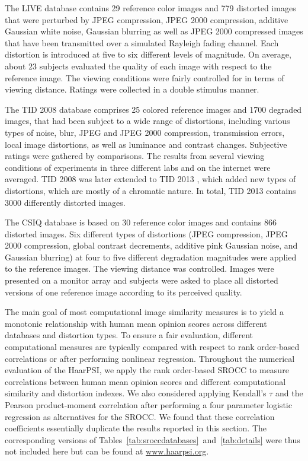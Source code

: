 \documentclass[11pt,a4paper]{article}
\begin{document}
The LIVE database \cite{SWCBOnline} contains 29 reference color images and 779 distorted images that were perturbed by JPEG compression, JPEG 2000 compression, additive Gaussian white
noise, Gaussian blurring as well as JPEG 2000 compressed images that have been transmitted over a simulated Rayleigh fading channel. Each distortion is introduced at five to six different levels of magnitude. On average, about 23 subjects evaluated the quality of each image with respect to the reference image. The viewing conditions were fairly controlled for in terms of viewing distance. Ratings were collected in a double stimulus manner.
 

The TID 2008 database \cite{PLZECB2009} comprises 25 colored reference images and 1700 degraded images, that had been subject to a wide range of distortions, including various types of noise, blur, JPEG and JPEG 2000 compression, transmission errors, local image distortions, as well as luminance and contrast changes. Subjective ratings were gathered by comparisons. The results from several viewing conditions of experiments in three different labs and on the internet were averaged. TID 2008 was later extended to TID 2013 \cite{Ponomarenko2015}, which added new types of distortions, which are mostly of a chromatic nature. In total, TID 2013 contains 3000 differently distorted images.

The CSIQ database \cite{LaCh2010} is based on 30 reference color images and contains 866 distorted images. Six different types of distortions (JPEG compression, JPEG 2000 compression, global contrast decrements, additive pink Gaussian noise, and Gaussian blurring) at four to five different degradation magnitudes were applied to the reference images. The viewing distance was controlled. Images were presented on a monitor array and subjects were asked to place all distorted versions of one reference image according to its perceived quality.

The main goal of most computational image similarity measures is to yield a monotonic relationship with human mean opinion scores across different databases and distortion types. To ensure a fair evaluation, different computational measures are typically compared with respect to rank order-based correlations or after performing nonlinear regression. Throughout the numerical evaluation of the HaarPSI, we apply the rank order-based SROCC to measure correlations between human mean opinion scores and different computational similarity and distortion indexes. We also considered applying Kendall's $\tau$ and the Pearson product-moment correlation after performing a four parameter logistic regression as alternatives for the SROCC. We found that these correlation coefficients essentially duplicate the results reported in this section. The corresponding versions of Tables~\ref{tab:sroccdatabases}~and~\ref{tab:details} were thus not included here but can be found at \url{www.haarpsi.org}.
\end{document}
